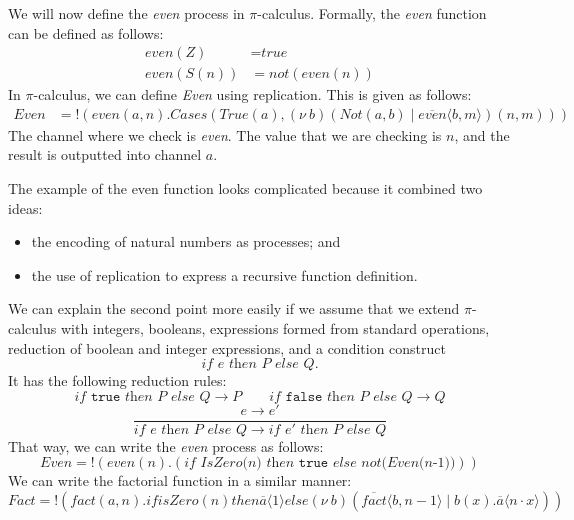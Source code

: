 \documentclass[a4paper, openany]{memoir}
\theoremstyle{definition}
\begin{document}
    We will now define the \textit{even} process in $\pi$-calculus. Formally, the \textit{even} function can be defined as follows:
    \begin{align*}
        \textit{even}(Z) &= \textit{true} \\
        \textit{even}(S(n)) &= \textit{not}(\textit{even}(n))
    \end{align*}
    In $\pi$-calculus, we can define \textit{Even} using replication. This is given as follows:
    \begin{align*}
        \textit{Even} &= !(\textit{even}(a, n).\textit{Cases}(\textit{True}(a), 
            (\nu \ b)(\textit{Not}(a, b) \mid \overline{\textit{even}} \langle b, m \rangle)(n, m)
        ))
    \end{align*}
    The channel where we check is \textit{even}. The value that we are checking is $n$, and the result is outputted into channel $a$.

    The example of the even function looks complicated because it combined two ideas:
    \begin{itemize}
        \item the encoding of natural numbers as processes; and
        \item the use of replication to express a recursive function definition.
    \end{itemize}
    We can explain the second point more easily if we assume that we extend $\pi$-calculus with integers, booleans, expressions formed from standard operations, reduction of boolean and integer expressions, and a condition construct
    \[\textit{if } e \textit{ then } P \textit{ else } Q.\]
    It has the following reduction rules:
    \[\textit{if } \texttt{true} \textit{ then } P \textit{ else } Q \to P \qquad \textit{if } \texttt{false} \textit{ then } P \textit{ else } Q \to Q \]
    \[\frac{e \to e'}{\textit{if } e \textit{ then } P \textit{ else } Q \to \textit{if } e' \textit{ then } P \textit{ else } Q}\]
    That way, we can write the \textit{even} process as follows:
    \[\textit{Even} = !(
        \textit{even}(n).(\textit{if IsZero(n) then }\texttt{true} \textit{ else not(Even(n-1))})
    )\]
    We can write the factorial function in a similar manner:
    \[\textit{Fact} = !(
        \textit{fact}(a, n).if isZero(n) then \overline{a} \langle 1 \rangle 
        else (\nu \ b)(\overline{fact} \langle b, n-1 \rangle \mid b(x).\overline{a} \langle n \cdot x \rangle)
    )\]
\end{document}
